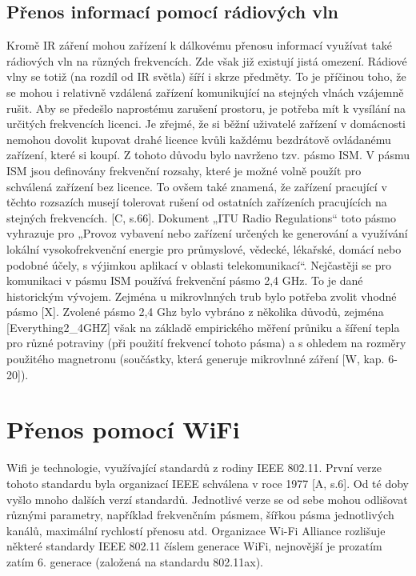 \subsection*{Přenos informací pomocí rádiových vln}
Kromě IR záření mohou zařízení k dálkovému přenosu informací využívat také rádiových vln na různých frekvencích. Zde však již existují jistá omezení. Rádiové vlny se totiž (na rozdíl od IR světla) šíří i skrze předměty. To je příčinou toho, že se mohou i relativně vzdálená zařízení komunikující na stejných vlnách vzájemně rušit. Aby se předešlo naprostému zarušení prostoru, je potřeba mít k vysílání na určitých frekvencích licenci. Je zřejmé, že si běžní uživatelé zařízení v domácnosti nemohou dovolit kupovat drahé licence kvůli každému bezdrátově ovládanému zařízení, které si koupí. Z tohoto důvodu bylo navrženo tzv. pásmo ISM. \newline
V pásmu ISM jsou definovány frekvenční rozsahy, které je možné volně použít pro schválená zařízení bez licence. To ovšem také znamená, že zařízení pracující v těchto rozsazích musejí tolerovat rušení od ostatních zařízeních pracujících na stejných frekvencích. [C, s.66]. Dokument „ITU Radio Regulations“ toto pásmo vyhrazuje pro „Provoz vybavení nebo zařízení určených ke generování a využívání lokální vysokofrekvenční energie pro průmyslové, vědecké, lékařské, domácí nebo podobné účely, s výjimkou aplikací v oblasti telekomunikací“. \newline
Nejčastěji se pro komunikaci v pásmu ISM používá frekvenční pásmo 2,4 GHz. To je dané historickým vývojem. Zejména u mikrovlnných trub bylo potřeba zvolit vhodné pásmo [X]. Zvolené pásmo 2,4 Ghz bylo vybráno z několika důvodů, zejména [Everything2\_4GHZ] však na základě empirického měření průniku a šíření tepla pro různé potraviny (při použití frekvencí tohoto pásma) a s ohledem na rozměry použitého magnetronu (součástky, která generuje mikrovlnné záření [W, kap. 6-20]).

\section{Přenos pomocí WiFi}

Wifi je technologie, využívající standardů z rodiny IEEE 802.11. První verze tohoto standardu byla organizací IEEE schválena v roce 1977 [A, s.6]. Od té doby vyšlo mnoho dalších verzí standardů. Jednotlivé verze se od sebe mohou odlišovat různými parametry, například frekvenčním pásmem, šířkou pásma jednotlivých kanálů, maximální rychlostí přenosu atd. Organizace Wi-Fi Alliance rozlišuje některé standardy IEEE 802.11 číslem generace WiFi, nejnovější je prozatím zatím 6. generace (založená na standardu 802.11ax). 

